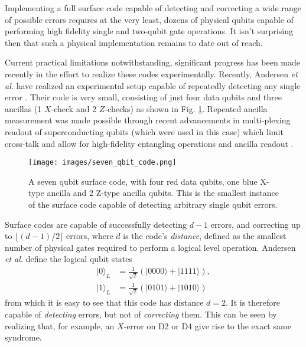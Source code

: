 Implementing a full surface code capable of detecting and correcting a wide
range of possible errors requires at the very least, dozens of physical qubits
capable of performing high fidelity single and two-qubit gate operations. It
isn't surprising then that such a physical implementation remains to date out of
reach. 

Current practical limitations notwithstanding, significant progress has been
made recently in the effort to realize these codes experimentally. Recently,
Andersen \textit{et al.} have realized an experimental setup capable of
repeatedly detecting any single error \cite{Andersen_2020}. Their code is very
small, consisting of just four data qubits and three ancillas (1 $X$-check and 2
$Z$-checks) as shown in Fig. \ref{fig:seven_qbit_code}. Repeated ancilla
measurement was made possible through recent advancements in multi-plexing
readout of superconducting qubits (which were used in this case) which limit
cross-talk and allow for high-fidelity entangling operations and ancilla readout
\cite{barends14_super_quant_circuit_at_surfac} \cite{Bultink_2020}.

\begin{figure}[h]
  \centering
  \texttt{[image: images/seven\_qbit\_code.png]}
  \caption{A seven qubit surface code, with four red data qubits, one blue
    X-type ancilla and 2 Z-type ancilla qubits. This is the smallest instance of
    the surface code capable of detecting arbitrary single qubit errors.}
  \label{fig:seven_qbit_code}
\end{figure}

Surface codes are capable of successfully detecting $d-1$ errors, and correcting
up to $\lfloor{(d-1)/2} \rfloor$ errors, where $d$ is the code's
\textit{distance}, defined as the smallest number of physical gates required to
perform a logical level operation. Andersen \textit{et al.} define the logical
qubit states
\begin{align}
|0\rangle_L &= \frac{1}{\sqrt{2}} (|0000\rangle + |1111\rangle) , \\
|1\rangle_L &= \frac{1}{\sqrt{2}} (|0101\rangle + |1010\rangle) 
\end{align}
from which it is easy to see that this code has distance $d=2$. It is therefore
capable of \textit{detecting} errors, but not of \textit{correcting} them. This
can be seen by realizing that, for example, an $X$-error on D2 or D4 give rise
to the exact same syndrome.


